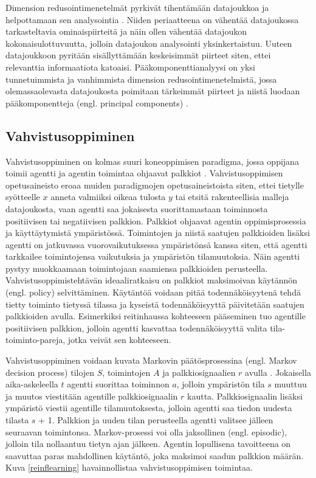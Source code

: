 \documentclass[utf8]{gradu3}
\begin{document}
Dimension redusointimenetelmät pyrkivät tihentämään datajoukkoa ja helpottamaan sen analysointia \parencite{usama2019unsupervised}. Niiden periaatteena on vähentää datajoukossa tarkasteltavia ominaispiirteitä ja näin ollen vähentää datajoukon kokonaisulottuvuutta, jolloin datajoukon analysointi yksinkertaistuu. Uuteen datajoukkoon pyritään sisällyttämään keskeisimmät piirteet siten, ettei relevanttia informaatiota katoaisi. Pääkomponenttianalyysi on yksi tunnetuimmista ja vanhimmista dimension redusointimenetelmistä, jossa olemassaolevasta datajoukosta poimitaan tärkeimmät piirteet ja niistä luodaan pääkomponentteja (engl. principal components) \parencite{abdi2010principal}.

\subsection{Vahvistusoppiminen}

Vahvistusoppiminen on kolmas suuri koneoppimisen paradigma, jossa oppijana toimii agentti ja agentin toimintaa ohjaavat palkkiot \parencite{arulkumaran2017brief,jordan2015machine,li2018deep}. Vahvistusoppimisen opetusaineisto eroaa muiden paradigmojen opetusaineistoista siten, ettei tietylle syötteelle \(x\) anneta valmiiksi oikeaa tulosta \(y\) tai etsitä rakenteellisia malleja datajoukosta, vaan agentti saa jokaisesta suorittamastaan toiminnosta positiivisen tai negatiivisen palkkion. Palkkiot ohjaavat agentin oppimisprosessia ja käyttäytymistä ympäristössä. Toimintojen ja niistä saatujen palkkioiden lisäksi agentti on jatkuvassa vuorovaikutuksessa ympäristönsä kanssa siten, että agentti tarkkailee toimintojensa vaikutuksia ja ympäristön tilamuutoksia. Näin agentti pystyy muokkaamaan toimintojaan saamiensa palkkioiden perusteella. Vahvistusoppimistehtävän ideaaliratkaisu on palkkiot maksimoivan käytännön (engl. policy) selvittäminen. Käytäntöä voidaan pitää todennäköisyytenä tehdä tietty toiminto tietyssä tilassa ja kyseistä todennäköisyyttä päivitetään saatujen palkkioiden avulla. Esimerkiksi reitinhaussa kohteeseen pääseminen tuo agentille positiivisen palkkion, jolloin agentti kasvattaa todennäköisyyttä valita tila-toiminto-pareja, jotka veivät sen kohteeseen.

Vahvistusoppiminen voidaan kuvata Markovin päätösprosessina (engl. Markov decision pro\-cess) tilojen \(S\), toimintojen \(A\) ja palkkiosignaalien \(r\) avulla \parencite{arulkumaran2017brief}. Jokaisella aika-askeleella \(t\) agentti suorittaa toiminnon \(a\), jolloin ympäristön tila \(s\) muuttuu ja muutos viestitään agentille palkkiosignaalin \(r\) kautta. Palkkiosignaalin lisäksi ympäristö viestii agentille tilamuutoksesta, jolloin agentti saa tiedon uudesta tilasta \(s\) + 1. Palkkion ja uuden tilan perusteella agentti valitsee jälleen seuraavan toimintonsa. Markov-prosessi voi olla jaksollinen (engl. episodic), jolloin tila nollaantuu tietyn ajan jälkeen. Agentin lopullisena tavoitteena on saavuttaa paras mahdollinen käytäntö, joka maksimoi saadun palkkion määrän. Kuva \ref{reinflearning} havainnollistaa vahvistusoppimisen toimintaa.
\end{document}

